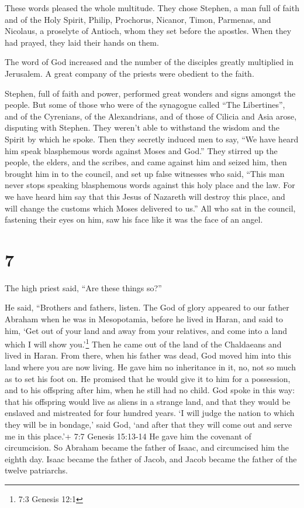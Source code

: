  These words pleased the whole multitude. They chose
Stephen, a man full of faith and of the Holy Spirit, Philip, Prochorus,
Nicanor, Timon, Parmenas, and Nicolaus, a proselyte of Antioch,
 whom they set before the apostles. When they had prayed,
they laid their hands on them.

 The word of God increased and the number of the disciples
greatly multiplied in Jerusalem. A great company of the priests were
obedient to the faith.

 Stephen, full of faith and power, performed great wonders
and signs amongst the people.  But some of those who were of
the synagogue called ``The Libertines'', and of the Cyrenians, of the
Alexandrians, and of those of Cilicia and Asia arose, disputing with
Stephen.  They weren't able to withstand the wisdom and the
Spirit by which he spoke.  Then they secretly induced men
to say, ``We have heard him speak blasphemous words against Moses and
God.''  They stirred up the people, the elders, and the
scribes, and came against him and seized him, then brought him in to the
council,  and set up false witnesses who said, ``This man
never stops speaking blasphemous words against this holy place and the
law.  For we have heard him say that this Jesus of Nazareth
will destroy this place, and will change the customs which Moses
delivered to us.''  All who sat in the council, fastening
their eyes on him, saw his face like it was the face of an angel.

\hypertarget{section-6}{%
\section{7}\label{section-6}}

 The high priest said, ``Are these things so?''

 He said, ``Brothers and fathers, listen. The God of glory
appeared to our father Abraham when he was in Mesopotamia, before he
lived in Haran,  and said to him, `Get out of your land and
away from your relatives, and come into a land which I will show
you.'\footnote{7:3 Genesis 12:1}  Then he came out of the
land of the Chaldaeans and lived in Haran. From there, when his father
was dead, God moved him into this land where you are now living.
 He gave him no inheritance in it, no, not so much as to set
his foot on. He promised that he would give it to him for a possession,
and to his offspring after him, when he still had no child. 
God spoke in this way: that his offspring would live as aliens in a
strange land, and that they would be enslaved and mistreated for four
hundred years.  `I will judge the nation to which they will
be in bondage,' said God, `and after that they will come out and serve
me in this place.'+ 7:7 Genesis 15:13-14  He gave him the
covenant of circumcision. So Abraham became the father of Isaac, and
circumcised him the eighth day. Isaac became the father of Jacob, and
Jacob became the father of the twelve patriarchs.

